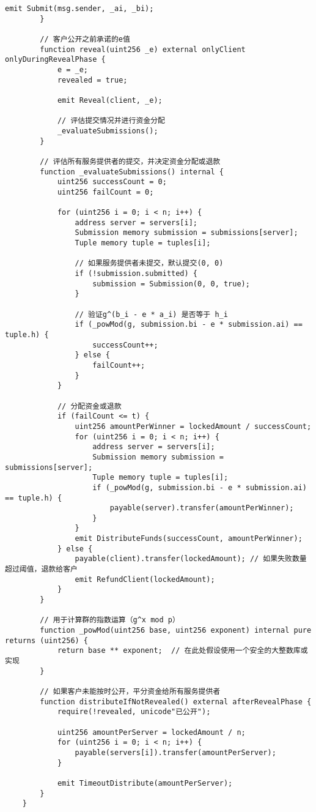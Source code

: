 \begin{lstlisting}[language=Solidity]
            emit Submit(msg.sender, _ai, _bi);
        }
    
        // 客户公开之前承诺的e值
        function reveal(uint256 _e) external onlyClient onlyDuringRevealPhase {
            e = _e;
            revealed = true;
    
            emit Reveal(client, _e);
    
            // 评估提交情况并进行资金分配
            _evaluateSubmissions();
        }
    
        // 评估所有服务提供者的提交，并决定资金分配或退款
        function _evaluateSubmissions() internal {
            uint256 successCount = 0;
            uint256 failCount = 0;
    
            for (uint256 i = 0; i < n; i++) {
                address server = servers[i];
                Submission memory submission = submissions[server];
                Tuple memory tuple = tuples[i];
    
                // 如果服务提供者未提交，默认提交(0, 0)
                if (!submission.submitted) {
                    submission = Submission(0, 0, true);
                }
    
                // 验证g^(b_i - e * a_i) 是否等于 h_i
                if (_powMod(g, submission.bi - e * submission.ai) == tuple.h) {
                    successCount++;
                } else {
                    failCount++;
                }
            }
    
            // 分配资金或退款
            if (failCount <= t) {
                uint256 amountPerWinner = lockedAmount / successCount;
                for (uint256 i = 0; i < n; i++) {
                    address server = servers[i];
                    Submission memory submission = submissions[server];
                    Tuple memory tuple = tuples[i];
                    if (_powMod(g, submission.bi - e * submission.ai) == tuple.h) {
                        payable(server).transfer(amountPerWinner);
                    }
                }
                emit DistributeFunds(successCount, amountPerWinner);
            } else {
                payable(client).transfer(lockedAmount); // 如果失败数量超过阈值，退款给客户
                emit RefundClient(lockedAmount);
            }
        }
    
        // 用于计算群的指数运算（g^x mod p）
        function _powMod(uint256 base, uint256 exponent) internal pure returns (uint256) {
            return base ** exponent;  // 在此处假设使用一个安全的大整数库或实现
        }
    
        // 如果客户未能按时公开，平分资金给所有服务提供者
        function distributeIfNotRevealed() external afterRevealPhase {
            require(!revealed, unicode"已公开");
    
            uint256 amountPerServer = lockedAmount / n;
            for (uint256 i = 0; i < n; i++) {
                payable(servers[i]).transfer(amountPerServer);
            }
    
            emit TimeoutDistribute(amountPerServer);
        }
    }
\end{lstlisting}

